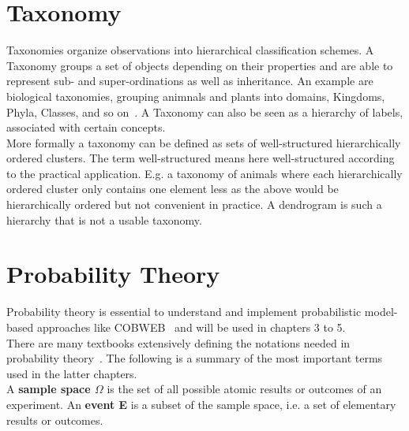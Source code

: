 \section{Taxonomy}\label{\positionnumber}
Taxonomies organize observations into hierarchical classification schemes. A Taxonomy groups a set of objects depending on their properties and are able to represent sub- and super-ordinations as well as inheritance. An example are biological taxonomies, grouping animnals and plants into domains, Kingdoms, Phyla, Classes, and so on~\cite{Krcmar2015, han2011data}. A Taxonomy can also be seen as a hierarchy of labels, associated with certain concepts. \\
More formally a taxonomy can be defined as sets of well-structured hierarchically ordered clusters. The term well-structured means here well-structured according to the practical application. E.g. a taxonomy of animals where each hierarchically ordered cluster only contains one element less as the above would be hierarchically ordered but not convenient in practice. A dendrogram is such a hierarchy that is not a usable taxonomy.

\section{Probability Theory}\label{\positionnumber}
Probability theory is essential to understand and implement probabilistic model-based approaches like COBWEB~\cite{Fisher1987} and will be used in chapters 3 to 5. \\
There are many textbooks extensively defining the notations needed in probability theory~\cite{Baron:2013:PSC:2536837, fahrmeir2016statistik}. The following is a summary of the most important terms used in the latter chapters.\\

A \textbf{sample space $\Omega$} is the set of all possible atomic results or outcomes of an experiment. An \textbf{event E} is a subset of the sample space, i.e. a set of elementary results or outcomes.  \\

